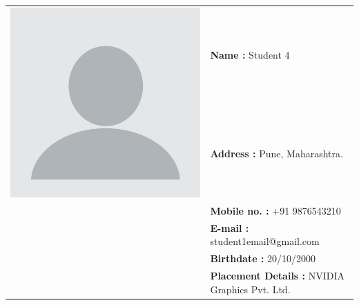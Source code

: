 \documentclass{report} %
\begin{document}
\begin{appendices}
		\centering
		\begin{tabular}{ll}
			\multirow{2}{*}{\includegraphics[scale=0.05]{images/student4.jpg}} & \textbf{Name :} Student 4 \\
			& \textbf{Address :} Pune, Maharashtra.  \\
			& \textbf{Mobile no. :} +91 9876543210  \\
			& \textbf{E-mail :} student1email@gmail.com  \\
			& \textbf{Birthdate :} 20/10/2000  \\
			& \textbf{Placement Details :} NVIDIA Graphics Pvt. Ltd.  \\
		\end{tabular}
		
	\end{appendices}
		
\end{document}
